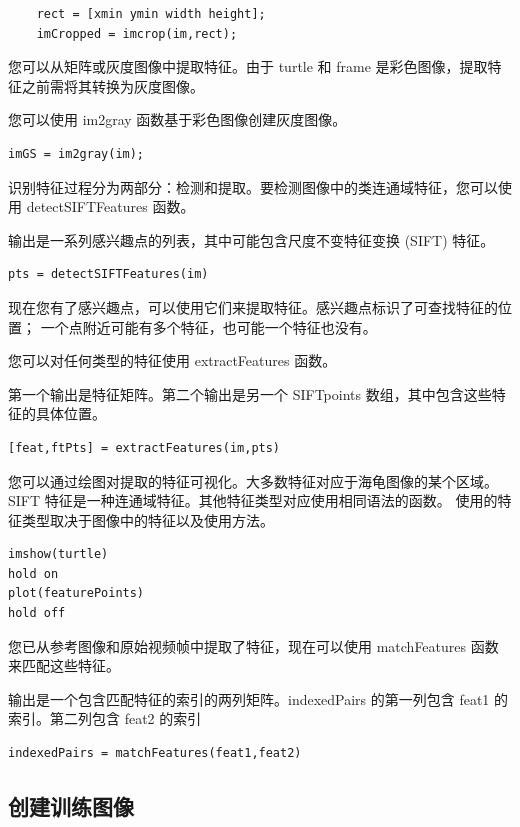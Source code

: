 \documentclass[12pt,a4paper]{article}
\begin{document}
\begin{lstlisting}
    rect = [xmin ymin width height];
    imCropped = imcrop(im,rect);
\end{lstlisting}

您可以从矩阵或灰度图像中提取特征。由于 turtle 和 frame 是彩色图像，提取特征之前需将其转换为灰度图像。

您可以使用 im2gray 函数基于彩色图像创建灰度图像。

\begin{lstlisting}
imGS = im2gray(im);
\end{lstlisting}

识别特征过程分为两部分：检测和提取。要检测图像中的类连通域特征，您可以使用 
detectSIFTFeatures 函数。

输出是一系列感兴趣点的列表，其中可能包含尺度不变特征变换 (SIFT) 特征。

\begin{lstlisting}
pts = detectSIFTFeatures(im)
\end{lstlisting}

现在您有了感兴趣点，可以使用它们来提取特征。感兴趣点标识了可查找特征的位置；
一个点附近可能有多个特征，也可能一个特征也没有。

您可以对任何类型的特征使用 extractFeatures 函数。

第一个输出是特征矩阵。第二个输出是另一个 SIFTpoints 数组，其中包含这些特征的具体位置。

\begin{lstlisting}
[feat,ftPts] = extractFeatures(im,pts)
\end{lstlisting}

您可以通过绘图对提取的特征可视化。大多数特征对应于海龟图像的某个区域。
SIFT 特征是一种连通域特征。其他特征类型对应使用相同语法的函数。
使用的特征类型取决于图像中的特征以及使用方法。

\begin{lstlisting}
imshow(turtle)
hold on
plot(featurePoints)
hold off
\end{lstlisting}

您已从参考图像和原始视频帧中提取了特征，现在可以使用 matchFeatures 
函数来匹配这些特征。

输出是一个包含匹配特征的索引的两列矩阵。indexedPairs 的第一列包含 
feat1 的索引。第二列包含 feat2 的索引

\begin{lstlisting}
indexedPairs = matchFeatures(feat1,feat2)
\end{lstlisting}

\subsection{创建训练图像}
\end{document}
